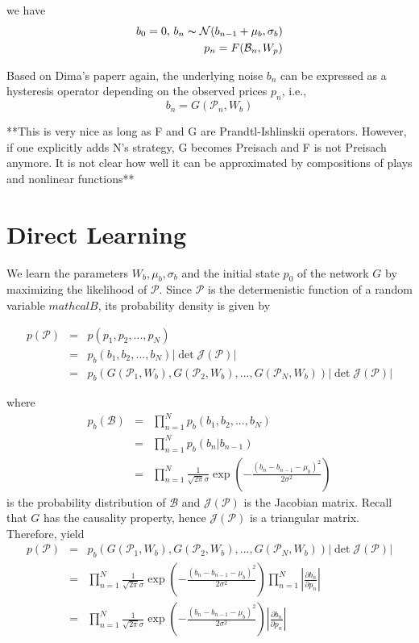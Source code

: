 \documentclass[11pt]{article}
\begin{document}
we have
\begin{eqnarray}
b_{0} = 0, \, b_{n} \thicksim \mathcal{N} (b_{n-1} + \mu_{b}, \sigma_{b}) \\
p_{n} = F(\mathcal{B}_n, W_{p})
\end{eqnarray}


Based on Dima's paperr again, the underlying noise \(b_n\) can be expressed as a hysteresis operator depending on
the observed prices \(p_n\), i.e.,
\[b_n=G(\mathcal{P}_n, W_b)\]


**This is very nice as long as F and G are Prandtl-Ishlinskii operators. However, if one explicitly adds N's strategy,
G becomes Preisach and F is not Preisach anymore. It is not clear how well it can be approximated by compositions of
plays and nonlinear functions**


\section{Direct Learning}
\label{sec:org70ad23b}
We learn the parameters \(W_b, \mu_b, \sigma_b\) and the initial state \(p_0\) of the network \(G\) by maximizing
the likelihood of \(\mathcal{P}\). Since \(\mathcal{P}\) is the determenistic function of a random variable
\(mathcal{B}\), its probability density is given by

\begin{eqnarray}
p(\mathcal{P}) &=& p(p_1, p_2, ..., p_N) \\
               &=& p_b(b_1, b_2, ..., b_N) \left|\det \mathcal{J(P)}\right| \\
               &=& p_b(G(\mathcal{P}_1, W_b), G(\mathcal{P}_2, W_b), ..., G(\mathcal{P}_N, W_b)) \left|\det \mathcal{J(P)}\right|
\end{eqnarray}

where
\begin{eqnarray}
p_b({\mathcal{B}}) &=& \prod_{n=1}^{N} p_b(b_1, b_2, ..., b_N) \\
                   &=& \prod_{n=1}^{N} p_b(b_n|b_{n-1}) \\
                   &=& \prod_{n=1}^{N} \frac{1}{\sqrt{2 \pi} \sigma} \exp\left(-\frac{(b_{n}-b_{n-1}-\mu_{b})^2}{2 \sigma^2}\right)
\end{eqnarray}
is the probability distribution of \(\mathcal{B}\) and \(\mathcal{J(P)}\) is the Jacobian matrix. Recall that \(G\) has the
causality property, hence \(\mathcal{J(P)}\) is a triangular matrix. Therefore, yield
\begin{eqnarray}
p(\mathcal{P}) &=& p_b(G(\mathcal{P}_1, W_b), G(\mathcal{P}_2, W_b), ..., G(\mathcal{P}_N, W_b)) \left|\det \mathcal{J(P)}\right| \\
               &=& \prod_{n=1}^{N} \frac{1}{\sqrt{2 \pi} \sigma} \exp\left(-\frac{(b_{n}-b_{n-1}-\mu_{b})^2}{2 \sigma^2}\right)
                   \prod_{n=1}^{N} \left| \frac{\partial b_n}{\partial p_n} \right| \\
               &=& \prod_{n=1}^{N} \frac{1}{\sqrt{2 \pi} \sigma} \exp\left(-\frac{(b_{n}-b_{n-1}-\mu_{b})^2}{2 \sigma^2}\right) \left|\frac{\partial b_n}{\partial p_n}\right|
\end{eqnarray}
\end{document}

